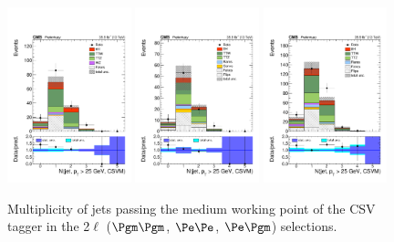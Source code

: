 \begin{figure}[htb]
	\centering 
\includegraphics[width=0.32\textwidth]{plots_leptons/lep_evtsel/2lss_SR/mm/nBJetMedium25.pdf}
\includegraphics[width=0.32\textwidth]{plots_leptons/lep_evtsel/2lss_SR/ee/nBJetMedium25.pdf}
\includegraphics[width=0.32\textwidth]{plots_leptons/lep_evtsel/2lss_SR/em/nBJetMedium25.pdf}
	\caption{Multiplicity of jets passing the medium working point of the CSV tagger in the 2$\ell$ ($\Pgm\Pgm$, $\Pe\Pe$, $\Pe\Pgm$) selections.}
	\label{fig:2l_nBJetMedium}
\end{figure}


